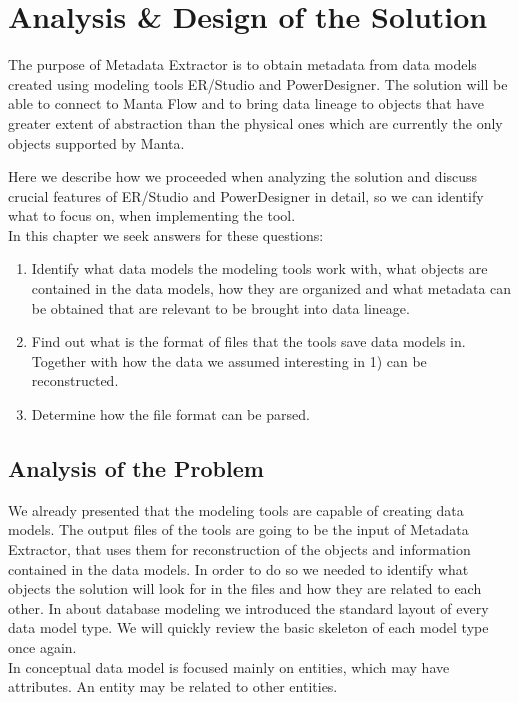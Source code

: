 \chapter{Analysis \& Design of the Solution}
\label{analysis_design}

The purpose of Metadata Extractor is to obtain metadata from data models created using modeling tools ER/Studio and PowerDesigner. The solution will be able to connect to Manta Flow and to bring data lineage to objects that have greater extent of abstraction than the physical ones which are currently the only objects supported by Manta.

Here we describe how we proceeded when analyzing the solution and discuss crucial features of ER/Studio and PowerDesigner in detail, so we can identify what to focus on, when implementing the tool.\\

In this chapter we seek answers for these questions:
\begin{enumerate}
	\item Identify what data models the modeling tools work with, what objects are contained in the data models, how they are organized and what metadata can be obtained that are relevant to be brought into data lineage.
	\item Find out what is the format of files that the tools save data models in. Together with how the data we assumed interesting in 1) can be reconstructed.
	\item Determine how the file format can be parsed.
\end{enumerate}

\section{Analysis of the Problem}

We already presented that the modeling tools are capable of creating data models. The output files of the tools are going to be the input of Metadata Extractor, that uses them for reconstruction of the objects and information contained in the data models.
In order to do so we needed to identify what objects the solution will look for in the files and how they are related to each other.
In  about database modeling we introduced the standard layout of every data model type. We will quickly review the basic skeleton of each model type once again. \\

In conceptual data model is focused mainly on entities, which may have attributes. An entity may be related to other entities.

